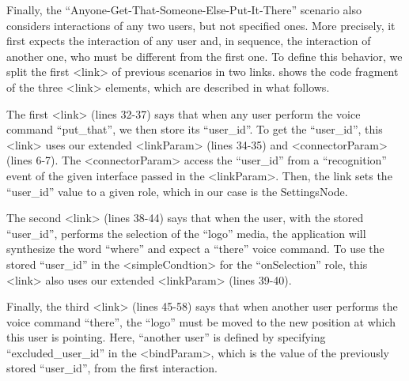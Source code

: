 Finally, the “Anyone-Get-That-Someone-Else-Put-It-There” scenario also considers
interactions of any two users, but not specified ones. More precisely, it first
expects the interaction of any user and, in sequence, the interaction of another
one, who must be different from the first one. To define this behavior, we split
the first <link> of previous scenarios in two links. \label{list:annexb7} shows
the code fragment of the three <link> elements, which are described in what
follows.

The first <link> (lines 32-37) says that when any user perform the voice command
“put\_that”, we then store its “user\_id”. To get the “user\_id”, this <link>
uses our extended <linkParam> (lines 34-35) and <connectorParam> (lines 6-7).
The <connectorParam> access the “user\_id” from a “recognition” event of the
given interface passed in the <linkParam>. Then, the link sets the “user\_id”
value to a given role, which in our case is the SettingsNode.

The second <link> (lines 38-44) says that when the user, with the stored
“user\_id”, performs the selection of the “logo” media, the application will
synthesize the word “where” and expect a “there” voice command. To use the
stored “user\_id” in the <simpleCondtion> for the “onSelection” role, this
<link> also uses our extended <linkParam> (lines 39-40).

Finally, the third <link> (lines 45-58) says that when another user performs the
voice command “there”, the “logo” must be moved to the new position at which
this user is pointing. Here, “another user” is defined by specifying
“excluded\_user\_id” in the <bindParam>, which is the value of the previously
stored “user\_id”, from the first interaction.

